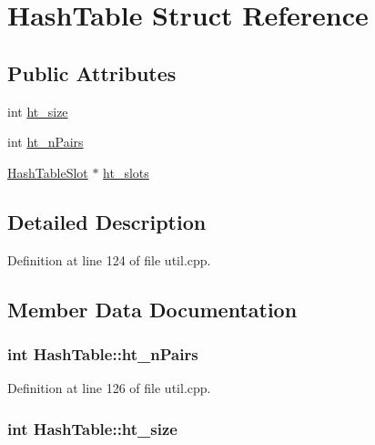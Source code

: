 \hypertarget{structHashTable}{\section{Hash\+Table Struct Reference}
\label{structHashTable}
}
\subsection*{Public Attributes}
\begin{DoxyCompactItemize}
\item 
int \hyperlink{structHashTable_a0417bd42eaced28297250a107dfc6843}{ht\+\_\+size}
\item 
int \hyperlink{structHashTable_a74747aaf3301627afdcddb55578e3c7b}{ht\+\_\+n\+Pairs}
\item 
\hyperlink{structHashTableSlot}{Hash\+Table\+Slot} $\ast$ \hyperlink{structHashTable_ab8cedc8a27628fcf828d19c222cb641b}{ht\+\_\+slots}
\end{DoxyCompactItemize}


\subsection{Detailed Description}


Definition at line 124 of file util.\+cpp.



\subsection{Member Data Documentation}
\hypertarget{structHashTable_a74747aaf3301627afdcddb55578e3c7b}{
\subsubsection[{ht\+\_\+n\+Pairs}]{\setlength{\rightskip}{0pt plus 5cm}int Hash\+Table\+::ht\+\_\+n\+Pairs}}\label{structHashTable_a74747aaf3301627afdcddb55578e3c7b}


Definition at line 126 of file util.\+cpp.

\hypertarget{structHashTable_a0417bd42eaced28297250a107dfc6843}{
\subsubsection[{ht\+\_\+size}]{\setlength{\rightskip}{0pt plus 5cm}int Hash\+Table\+::ht\+\_\+size}}\label{structHashTable_a0417bd42eaced28297250a107dfc6843}


